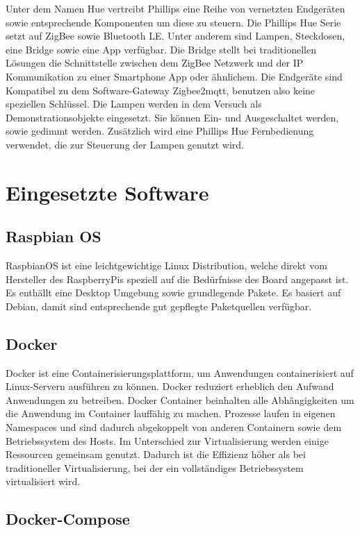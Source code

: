 Unter dem Namen \grqq Hue\grqq{} vertreibt Phillips eine Reihe von vernetzten Endgeräten sowie entsprechende Komponenten um diese zu steuern.
Die Phillips Hue Serie setzt auf ZigBee sowie Bluetooth LE. Unter anderem sind Lampen, Steckdosen, eine Bridge sowie eine App verfügbar.
Die Bridge stellt bei traditionellen Lösungen die Schnittstelle zwischen dem ZigBee Netzwerk und der IP Kommunikation zu einer Smartphone
App oder ähnlichem. Die Endgeräte sind Kompatibel zu dem Software-Gateway Zigbee2mqtt, benutzen also keine speziellen Schlüssel.
Die Lampen werden in dem Versuch als Demonstrationsobjekte eingesetzt. Sie können Ein- und Ausgeschaltet werden, sowie gedimmt werden. Zusätzlich wird eine
Phillips Hue Fernbedienung verwendet, die zur Steuerung der Lampen genutzt wird.

\section{Eingesetzte Software}

\subsection{Raspbian OS}

RaspbianOS ist eine leichtgewichtige Linux Distribution, welche direkt vom Hersteller des RaspberryPis speziell auf die Bedürfnisse des Board angepasst ist. Es enthällt eine
Desktop Umgebung sowie grundlegende Pakete. Es basiert auf Debian, damit sind entsprechende gut gepflegte Paketquellen verfügbar. 

\subsection{Docker}

Docker ist eine Containerisierungsplattform, um Anwendungen containerisiert auf Linux-Servern ausführen zu können. Docker reduziert erheblich den Aufwand 
Anwendungen zu betreiben. Docker Container beinhalten alle Abhängigkeiten um die Anwendung im Container lauffähig zu machen.
Prozesse laufen in eigenen Namespaces und sind dadurch abgekoppelt von anderen Containern sowie dem Betriebssystem des Hosts. Im Unterschied zur Virtualisierung werden
einige Ressourcen gemeinsam genutzt. Dadurch ist die Effizienz höher als bei traditioneller Virtualisierung, bei der ein vollständiges Betriebssystem virtualisiert wird.

\subsection{Docker-Compose}

